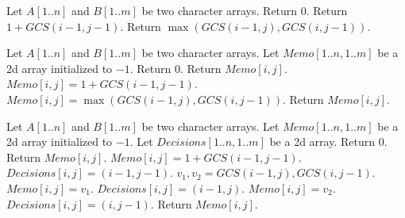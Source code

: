 \begin{algorithm}
\begin{algorithmic}[1]
\State Let $A[1..n]$ and $B[1..m]$ be two character arrays.
		\State Return $0$.
		\State Return $1 + GCS(i-1,j-1)$.
	\Else 
		\State Return $\max(GCS(i-1,j),GCS(i,j-1))$.
	\EndIf
\EndProcedure
\end{algorithmic}
\end{algorithm}
\begin{algorithm}
\begin{algorithmic}[1]
\State Let $A[1..n]$ and $B[1..m]$ be two character arrays.
\State Let $Memo[1..n,1..m]$ be a 2d array initialized to $-1$.
		\State Return $0$.
		\State Return $Memo[i,j]$.
		\State $Memo[i,j] = 1 + GCS(i-1,j-1)$.
	\Else 
		\State $Memo[i,j] = \max(GCS(i-1,j),GCS(i,j-1))$.
	\EndIf
	\State Return $Memo[i,j]$.
\EndProcedure
\end{algorithmic}
\end{algorithm}
\begin{algorithm*}
\begin{algorithmic}[1]
\State Let $A[1..n]$ and $B[1..m]$ be two character arrays.
\State Let $Memo[1..n,1..m]$ be a 2d array initialized to $-1$.
\State Let $Decisions[1..n,1..m]$ be a 2d array.
		\State Return $0$.
		\State Return $Memo[i,j]$.
		\State $Memo[i,j] = 1 + GCS(i-1,j-1)$.
		\State $Decisions[i,j] = (i-1,j-1)$.
	\Else 
		\State $v_1, v_2 = GCS(i-1,j), GCS(i,j-1)$.
			\State $Memo[i,j] = v_1$.
			\State $Decisions[i,j] = (i-1,j)$.
		\Else
			\State $Memo[i,j] = v_2$.
			\State $Decisions[i,j] = (i,j-1)$.
		\EndIf
	\EndIf
	\State Return $Memo[i,j]$.
\EndProcedure
\end{algorithmic}
\end{algorithm*}
